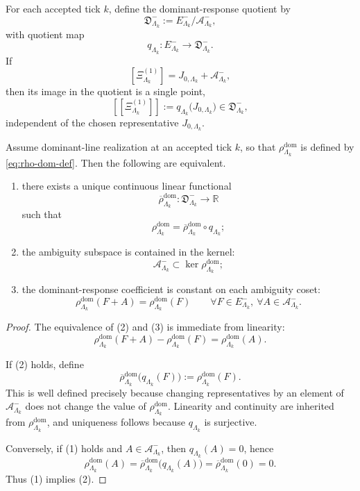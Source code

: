 \documentclass[11pt]{article}
\begin{document}
\begin{definition}
\label{def:dominant-response-quotient}
For each accepted tick \(k\), define the dominant-response quotient by
\[
\mathfrak D^-_{\Lambda_k}
:=
E^-_{\Lambda_k}/\mathcal A^-_{\Lambda_k},
\]
with quotient map
\[
q_{\Lambda_k}:E^-_{\Lambda_k}\to \mathfrak D^-_{\Lambda_k}.
\]
If
\[
[\Xi^{(1)}_{\Lambda_k}]
=
J_{0,\Lambda_k}+\mathcal A^-_{\Lambda_k},
\]
then its image in the quotient is a single point,
\[
[\![\Xi^{(1)}_{\Lambda_k}]\!]
:=
q_{\Lambda_k}\!\big(J_{0,\Lambda_k}\big)
\in \mathfrak D^-_{\Lambda_k},
\]
independent of the chosen representative \(J_{0,\Lambda_k}\).
\end{definition}

\begin{proposition}
\label{prop:dominant-quotient-universal}
Assume dominant-line realization at an accepted tick \(k\), so that
\(\rho^{\mathrm{dom}}_{\Lambda_k}\) is defined by \eqref{eq:rho-dom-def}.
Then the following are equivalent.
\begin{enumerate}[leftmargin=2em]
\item there exists a unique continuous linear functional
  \[
  \overline{\rho}^{\mathrm{dom}}_{\Lambda_k}:\mathfrak D^-_{\Lambda_k}\to\mathbb R
  \]
  such that
  \[
  \rho^{\mathrm{dom}}_{\Lambda_k}
  =
  \overline{\rho}^{\mathrm{dom}}_{\Lambda_k}\circ q_{\Lambda_k};
  \]
\item the ambiguity subspace is contained in the kernel:
  \[
  \mathcal A^-_{\Lambda_k}\subset \ker\rho^{\mathrm{dom}}_{\Lambda_k};
  \]
\item the dominant-response coefficient is constant on each ambiguity coset:
  \[
  \rho^{\mathrm{dom}}_{\Lambda_k}(F+A)
  =
  \rho^{\mathrm{dom}}_{\Lambda_k}(F)
  \qquad
  \forall F\in E^-_{\Lambda_k},\ \forall A\in\mathcal A^-_{\Lambda_k}.
  \]
\end{enumerate}
\end{proposition}

\begin{proof}
The equivalence of (2) and (3) is immediate from linearity:
\[
\rho^{\mathrm{dom}}_{\Lambda_k}(F+A)-\rho^{\mathrm{dom}}_{\Lambda_k}(F)
=
\rho^{\mathrm{dom}}_{\Lambda_k}(A).
\]

If (2) holds, define
\[
\overline{\rho}^{\mathrm{dom}}_{\Lambda_k}\big(q_{\Lambda_k}(F)\big)
:=
\rho^{\mathrm{dom}}_{\Lambda_k}(F).
\]
This is well defined precisely because changing representatives by an element of
\(\mathcal A^-_{\Lambda_k}\) does not change the value of \(\rho^{\mathrm{dom}}_{\Lambda_k}\).
Linearity and continuity are inherited from \(\rho^{\mathrm{dom}}_{\Lambda_k}\), and uniqueness
follows because \(q_{\Lambda_k}\) is surjective.

Conversely, if (1) holds and \(A\in\mathcal A^-_{\Lambda_k}\), then \(q_{\Lambda_k}(A)=0\), hence
\[
\rho^{\mathrm{dom}}_{\Lambda_k}(A)
=
\overline{\rho}^{\mathrm{dom}}_{\Lambda_k}\!\big(q_{\Lambda_k}(A)\big)
=
\overline{\rho}^{\mathrm{dom}}_{\Lambda_k}(0)
=
0.
\]
Thus (1) implies (2).
\end{proof}
\end{document}
